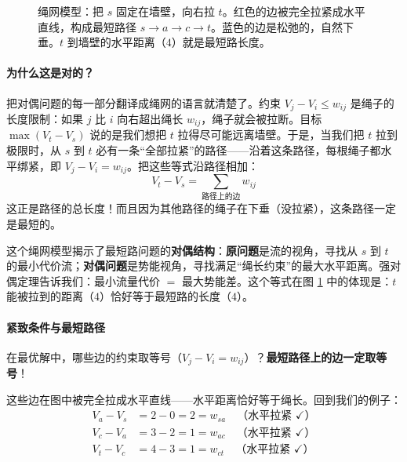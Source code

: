 \begin{figure}[htbp]
\caption{绳网模型：把 $s$ 固定在墙壁，向右拉 $t$。红色的边被完全拉紧成水平直线，构成最短路径 $s \to a \to c \to t$。蓝色的边是松弛的，自然下垂。$t$ 到墙壁的水平距离（$4$）就是最短路长度。}
\label{fig:rope-network}
\end{figure}

\paragraph{为什么这是对的？}

把对偶问题的每一部分翻译成绳网的语言就清楚了。约束 $V_j - V_i \leq w_{ij}$ 是绳子的长度限制：如果 $j$ 比 $i$ 向右超出绳长 $w_{ij}$，绳子就会被拉断。目标 $\max(V_t - V_s)$ 说的是我们想把 $t$ 拉得尽可能远离墙壁。于是，当我们把 $t$ 拉到极限时，从 $s$ 到 $t$ 必有一条“全部拉紧”的路径——沿着这条路径，每根绳子都水平绑紧，即 $V_j - V_i = w_{ij}$。把这些等式沿路径相加：
\[
    V_t - V_s = \sum_{\text{路径上的边}} w_{ij}
\]
这正是路径的总长度！而且因为其他路径的绳子在下垂（没拉紧），这条路径一定是最短的。

\begin{remark}
这个绳网模型揭示了最短路问题的\textbf{对偶结构}：\textbf{原问题}是流的视角，寻找从 $s$ 到 $t$ 的最小代价流；\textbf{对偶问题}是势能视角，寻找满足“绳长约束”的最大水平距离。强对偶定理告诉我们：最小流量代价 $=$ 最大势能差。这个等式在图 \ref{fig:rope-network} 中的体现是：$t$ 能被拉到的距离（$4$）恰好等于最短路的长度（$4$）。
\end{remark}

\paragraph{紧致条件与最短路径}

在最优解中，哪些边的约束取等号（$V_j - V_i = w_{ij}$）？\textbf{最短路径上的边一定取等号}！

这些边在图中被完全拉成水平直线——水平距离恰好等于绳长。回到我们的例子：
\begin{align*}
    V_a - V_s &= 2 - 0 = 2 = w_{sa} \quad \text{（水平拉紧 }\checkmark\text{）} \\
    V_c - V_a &= 3 - 2 = 1 = w_{ac} \quad \text{（水平拉紧 }\checkmark\text{）} \\
    V_t - V_c &= 4 - 3 = 1 = w_{ct} \quad \text{（水平拉紧 }\checkmark\text{）}
\end{align*}

